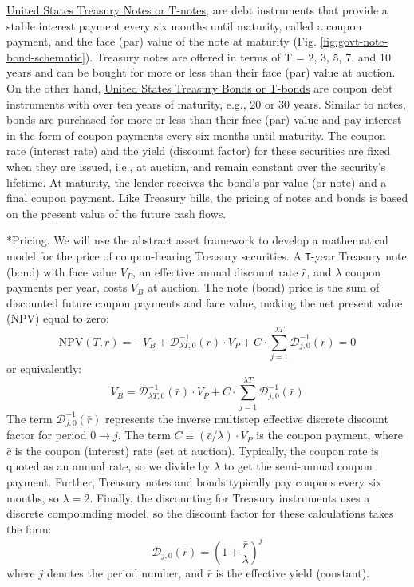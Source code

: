 \documentclass[11pt]{article}
\makeatletter
\theoremstyle{definition}
\renewcommand\subsubsection{\@startsection
	{subsubsection}{2}{0mm}
	{-0.05in}
	{-0.5\baselineskip}
	{\normalfont\normalsize\itshape\bfseries}}
\makeatother
\begin{document}
\href{https://treasurydirect.gov/marketable-securities/treasury-notes/}{United States Treasury Notes or T-notes}, 
are debt instruments that provide a stable interest payment every six months until maturity, called a coupon payment, and the face (par) value of the note at maturity (Fig. \ref{fig:govt-note-bond-schematic}).
Treasury notes are offered in terms of T = 2, 3, 5, 7, and 10 years and can be bought for more or less than their face (par) value at auction.
On the other hand,  \href{https://treasurydirect.gov/marketable-securities/treasury-bonds/}{United States Treasury Bonds or T-bonds} 
are coupon debt instruments with over ten years of maturity, e.g., 20 or 30 years. Similar to notes, bonds are purchased for more or less than their face (par) value and pay interest in the form of coupon payments every six months until maturity.
The coupon rate (interest rate) and the yield (discount factor) for these securities are fixed when they are issued, i.e., at auction, and remain constant over the security's lifetime.
At maturity, the lender receives the bond's par value (or note) and a final coupon payment. 
Like Treasury bills, the pricing of notes and bonds is based on the present value of the future cash flows. 

\subsubsection*{Pricing.}
We will use the abstract asset framework to develop a mathematical model for the price of coupon-bearing Treasury securities.
A \texttt{T}-year Treasury note (bond) with face value $V_{P}$, an effective annual discount rate $\bar{r}$, and $\lambda$ coupon payments per year, costs $V_{B}$ at auction.
The note (bond) price is the sum of discounted future coupon payments and face value, making the net present value (NPV) equal to zero:
\begin{equation}
\text{NPV}(T,\bar{r}) = -V_{B} + \mathcal{D}^{-1}_{\lambda{T},0}(\bar{r})\cdot{V_{P}}+C\cdot\sum_{j=1}^{\lambda{T}}\mathcal{D}_{j,0}^{-1}(\bar{r}) = 0
\end{equation}
or equivalently:
\begin{equation}
V_{B} = \mathcal{D}^{-1}_{\lambda{T},0}(\bar{r})\cdot{V_{P}}+C\cdot\sum_{j=1}^{\lambda{T}}\mathcal{D}_{j,0}^{-1}(\bar{r})
\end{equation}
The term $\mathcal{D}_{j,0}^{-1}(\bar{r})$ represents the inverse multistep effective discrete discount factor for period $0\rightarrow{j}$. 
The term $C\equiv(\bar{c}/\lambda)\cdot{V_{P}}$ is the coupon payment, where $\bar{c}$ is the coupon (interest) rate (set at auction).
Typically, the coupon rate is quoted as an annual rate, so we divide by $\lambda$ to get the semi-annual coupon payment.
Further, Treasury notes and bonds typically pay coupons every six months, so $\lambda=2$.
Finally, the discounting for Treasury instruments uses a discrete compounding model, so the discount factor for these calculations takes the form:
\begin{equation}
\mathcal{D}_{j,0}(\bar{r}) = \left(1+\frac{\bar{r}}{\lambda}\right)^{j}
\end{equation}
where $j$ denotes the period number, and $\bar{r}$ is the effective yield (constant).
\end{document}

